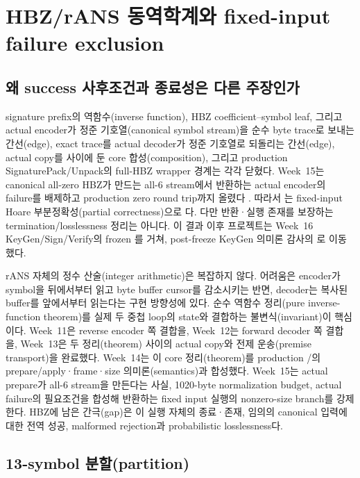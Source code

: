 \section{HBZ/rANS 동역학계와 fixed-input failure exclusion}
\label{sec:rans-frontier}

\subsection{왜 success 사후조건과 종료성은 다른 주장인가}

signature prefix의 역함수(inverse function), HBZ coefficient--symbol leaf,
그리고 actual encoder가 정준 기호열(canonical symbol stream)을 순수 byte
trace로 보내는 간선(edge), exact trace를 actual decoder가 정준 기호열로
되돌리는 간선(edge), actual copy를 사이에 둔 core 합성(composition), 그리고
production SignaturePack/Unpack의 full-HBZ wrapper 경계는 각각 닫혔다.
Week~15는 canonical all-zero HBZ가 만드는 all-6 stream에서 반환하는 actual
encoder의 failure를 배제하고 production zero round trip까지 올렸다
\cite{week15-report,rans-actual-success-witness}. 따라서
는 fixed-input Hoare
부분정확성(partial correctness)으로 \statusproved 다. 다만 반환·실행 존재를
보장하는 termination/losslessness 정리는 아니다. 이 결과 이후 프로젝트는
Week~16 KeyGen/Sign/Verify의 frozen \FrozenPaperGate 를 거쳐, post-freeze
KeyGen 의미론 감사의 \CurrentGate 로 이동했다.

rANS 자체의 정수 산술(integer arithmetic)은 복잡하지 않다. 어려움은 encoder가
symbol을 뒤에서부터
읽고 byte buffer cursor를 감소시키는 반면, decoder는 복사된 buffer를 앞에서부터
읽는다는 구현 방향성에 있다. 순수 역함수 정리(pure inverse-function theorem)를
실제 두 중첩 loop의 state와 결합하는 불변식(invariant)이 핵심이다. Week~11은
reverse encoder 쪽 결합을, Week~12는 forward decoder 쪽 결합을, Week~13은
두 정리(theorem) 사이의 actual copy와 전제 운송(premise transport)을 완료했다.
Week~14는 이 core 정리(theorem)를 production
/의
prepare/apply·frame·size 의미론(semantics)과 합성했다. Week~15는 actual prepare가
all-6 stream을 만든다는 사실, 1020-byte normalization budget, actual failure의
필요조건을 합성해 반환하는 fixed input 실행의 nonzero-size branch를 강제한다.
HBZ에 남은 간극(gap)은 이 실행 자체의 종료·존재, 임의의 canonical 입력에 대한
전역 성공, malformed rejection과 probabilistic losslessness다.

\subsection{13-symbol 분할(partition)}

